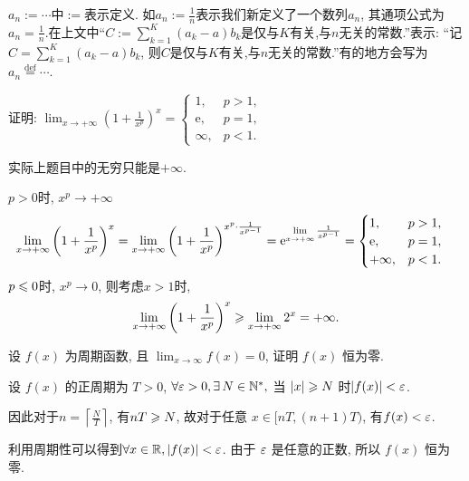 \begin{remark}
    $a_n := \cdots$中$:=$表示定义. 如$a_n := \frac{1}{n}$表示我们新定义了一个数列$a_n$, 其通项公式为$a_n = \frac{1}{n}$.在上文中“$C := \sum_{k=1}^{K}(a_k - a)b_k$是仅与$K$有关,与$n$无关的常数.”表示: “记$C = \sum_{k=1}^{K}(a_k - a)b_k$, 则$C$是仅与$K$有关,与$n$无关的常数.”有的地方会写为$a_n \overset{\text{def}}{=} \cdots$.
\end{remark}

\begin{exercise}[1.C.13]
    证明: $\lim_{x \to +\infty} \left(1+\frac{1}{x^p}\right)^x = \begin{cases} 1,  & p > 1,  \\ \mathrm{e},  & p = 1,  \\ \infty,  & p < 1. \end{cases}$
\end{exercise}
\begin{solution}
    实际上题目中的无穷只能是$+\infty$.

    $p>0$时, $x^p\to+\infty$
    \begin{align*}
        \lim_{x \to +\infty} \left(1+\frac{1}{x^p}\right)^x & = \lim_{x \to +\infty} \left(1+\frac{1}{x^p}\right)^{x^p\cdot\frac{1}{x^{p-1}}} = \mathrm{e}^{\lim\limits_{x \to +\infty}\frac{1}{x^{p-1}}} = \begin{cases} 1,  & p > 1, \\
              \mathrm{e}, & p = 1, \\ +\infty,  & p < 1.\end{cases}
    \end{align*}
    $p\leqslant 0$时, $x^p\to 0$, 则考虑$x>1$时,
    $$\lim_{x \to +\infty} \left(1+\frac{1}{x^p}\right)^x\geqslant\lim_{x \to +\infty}  2^x=+\infty.$$
\end{solution}
\begin{exercise}[1.C.14]
    设 $f(x)$ 为周期函数,  且 $\lim_{x \to \infty} f(x) = 0$,  证明 $f(x)$ 恒为零.
\end{exercise}
\begin{solution}
    设 $f(x)$ 的正周期为 $T>0$,  $\forall \ve >0, \exists N \in \N^*, $ 当 $|x|\geqslant N$ 时$|f(x)|<\varepsilon$.

    因此对于$n=\left\lceil \frac{N}{T}\right\rceil$, 有$nT\geqslant N$, 故对于任意 $x \in [nT,  (n+1)T)$,  有$f(x)<\varepsilon$.

    利用周期性可以得到$\forall x \in \mathbb{R},  |f(x)| < \varepsilon$.
    由于 $\varepsilon$ 是任意的正数,  所以 $f(x)$ 恒为零.
\end{solution}

